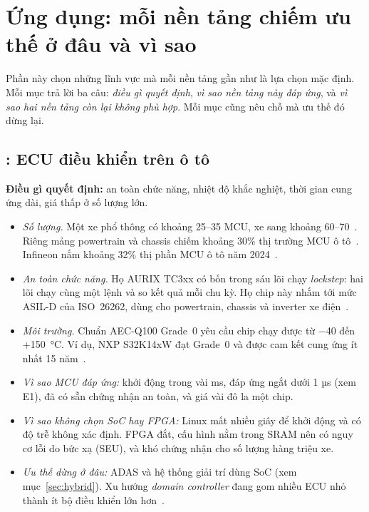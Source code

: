 \documentclass[11pt,a4paper]{article}
\begin{document}
\section{Ứng dụng: mỗi nền tảng chiếm ưu thế ở đâu và vì sao}

Phần này chọn những lĩnh vực mà mỗi nền tảng gần như là lựa chọn mặc định. Mỗi mục trả lời ba câu: \emph{điều gì quyết định}, \emph{vì sao nền tảng này đáp ứng}, và \emph{vì sao hai nền tảng còn lại không phù hợp}. Mỗi mục cũng nêu chỗ mà ưu thế đó dừng lại.

\subsection{\MCU: ECU điều khiển trên ô tô}

\textbf{Điều gì quyết định:} an toàn chức năng, nhiệt độ khắc nghiệt, thời gian cung ứng dài, giá thấp ở số lượng lớn.
\begin{itemize}
\item \emph{Số lượng.} Một xe phổ thông có khoảng 25–35 MCU, xe sang khoảng 60–70~\cite{ew-mcu}. Riêng mảng powertrain và chassis chiếm khoảng 30\% thị trường MCU ô tô~\cite{gmi}. Infineon nắm khoảng 32\% thị phần MCU ô tô năm 2024~\cite{infineon-share}.
\item \emph{An toàn chức năng.} Họ AURIX TC3xx có bốn trong sáu lõi chạy \emph{lockstep}: hai lõi chạy cùng một lệnh và so kết quả mỗi chu kỳ. Họ chip này nhắm tới mức ASIL-D của ISO~26262, dùng cho powertrain, chassis và inverter xe điện~\cite{aurix}.
\item \emph{Môi trường.} Chuẩn AEC-Q100 Grade~0 yêu cầu chip chạy được từ −40 đến +150~°C. Ví dụ, NXP S32K14xW đạt Grade~0 và được cam kết cung ứng ít nhất 15 năm~\cite{s32k}.
\item \emph{Vì sao MCU đáp ứng:} khởi động trong vài ms, đáp ứng ngắt dưới 1 µs (xem E1), đã có sẵn chứng nhận an toàn, và giá vài đô la một chip.
\item \emph{Vì sao không chọn SoC hay FPGA:} Linux mất nhiều giây để khởi động và có độ trễ không xác định. FPGA đắt, cấu hình nằm trong SRAM nên có nguy cơ lỗi do bức xạ (SEU), và khó chứng nhận cho số lượng hàng triệu xe.
\item \emph{Ưu thế dừng ở đâu:} ADAS và hệ thống giải trí dùng SoC (xem mục~\ref{sec:hybrid}). Xu hướng \emph{domain controller} đang gom nhiều ECU nhỏ thành ít bộ điều khiển lớn hơn~\cite{ew-mcu}.
\end{itemize}
\end{document}
